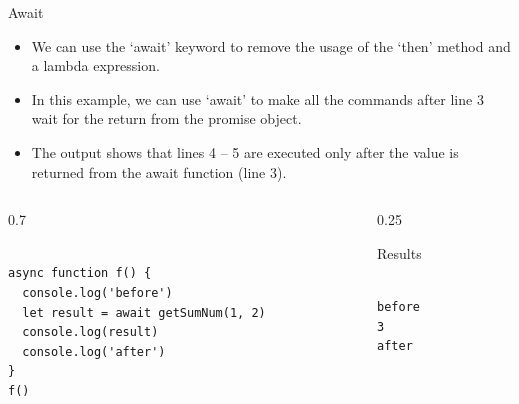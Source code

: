 \begin{frame}[fragile]{Await}

\begin{itemize}
	\item We can use the `await' keyword to remove the usage of the `then' method and a lambda expression.  
	\item In this example, we can use `await' to make all the commands after line 3 wait for the return from the promise object. 
	\item The output shows that lines 4 -- 5 are executed only after the value is returned from the await function (line 3). 
\end{itemize}

\begin{columns}%
\begin{column}{0.7\textwidth}%
\begin{Code}{}%
\begin{lstlisting}[firstnumber=1, label=glabels, xleftmargin=0pt, basicstyle=\tiny]% 

async function f() {
  console.log('before')
  let result = await getSumNum(1, 2)
  console.log(result)
  console.log('after')
}
f()
\end{lstlisting}%
\end{Code}%
\end{column}%
\begin{column}{0.25\textwidth}%
\begin{Command}{Results}%
\begin{lstlisting}[firstnumber=1, label=glabels, xleftmargin=0pt, basicstyle=\tiny]% 

before
3
after
\end{lstlisting}%
\end{Command}%
\end{column}%
\end{columns}%
\end{frame}

